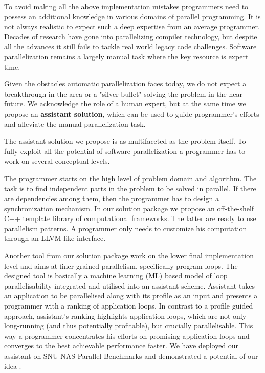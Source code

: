 
\quad To avoid making all the above implementation mistakes programmers need to possess an additional knowledge in various domains of parallel programming. It is not always realistic to expect such a deep expertise from an average programmer. Decades of research have gone into parallelizing compiler technology, but despite all the advances it still fails to tackle real world legacy code challenges. Software parallelization remains a largely manual task where the key resource is expert time.


\quad Given the obstacles automatic parallelization faces today, we do not expect a breakthrough in the area or a "silver bullet" solving the problem in the near future. We acknowledge the role of a human expert, but at the same time we propose an \textbf{assistant solution}, which can be used to guide programmer's efforts and alleviate the manual parallelization task.


\quad The assistant solution we propose is as multifaceted as the problem itself. To fully exploit all the potential of software parallelization a programmer has to work on several conceptual levels. 


\quad The programmer starts on the high level of problem domain and algorithm. The task is to find independent parts in the problem to be solved in parallel. If there are dependencies among them, then the programmer has to design a synchronization mechanism. In our solution package we propose an off-the-shelf C++ template library of computational frameworks. The latter are ready to use parallelism patterns. A programmer only needs to customize his computation through an LLVM-like interface.


\quad Another tool from our solution package work on the lower final implementation level and aims at finer-grained parallelism, specifically program loops. The designed tool is basically a machine learning (ML) based model of loop parallelisability integrated and utilised into an assistant scheme. Assistant takes an application to be parallelised along with its profile as an input and presents a programmer with a ranking of application loops. In contrast to a profile guided approach, assistant's ranking highlights application loops, which are not only long-running (and thus potentially profitable), but crucially parallelisable. This way a programmer concentrates his efforts on promising application loops and converges to the best achievable performance faster. We have deployed our assistant on SNU NAS Parallel Benchmarks \cite{snu-npb-benchmarks} \cite{nasa-parallel-benchmarks} and demonstrated a potential of our idea \cite{aiseps}.



